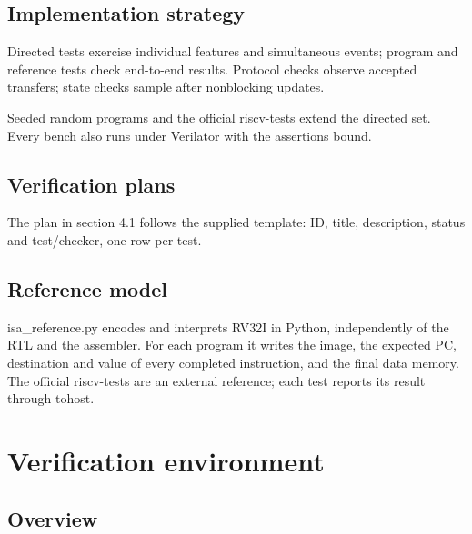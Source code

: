 \documentclass[11pt]{article}
\begin{document}
\subsection{Implementation strategy}
\noindent Directed tests exercise individual features and simultaneous events; program and reference tests check end-to-end results. Protocol checks observe accepted transfers; state checks sample after nonblocking updates.\par\medskip
\noindent Seeded random programs and the official riscv-tests extend the directed set. Every bench also runs under Verilator with the assertions bound.\par\medskip

\subsection{Verification plans}
\noindent The plan in section 4.1 follows the supplied template: ID, title, description, status and test/checker, one row per test.\par\medskip

\subsection{Reference model}
\noindent isa\_reference.py encodes and interprets RV32I in Python, independently of the RTL and the assembler. For each program it writes the image, the expected PC, destination and value of every completed instruction, and the final data memory. The official riscv-tests are an external reference; each test reports its result through tohost.\par\medskip

\clearpage
\section{Verification environment}
\subsection{Overview}
\end{document}
